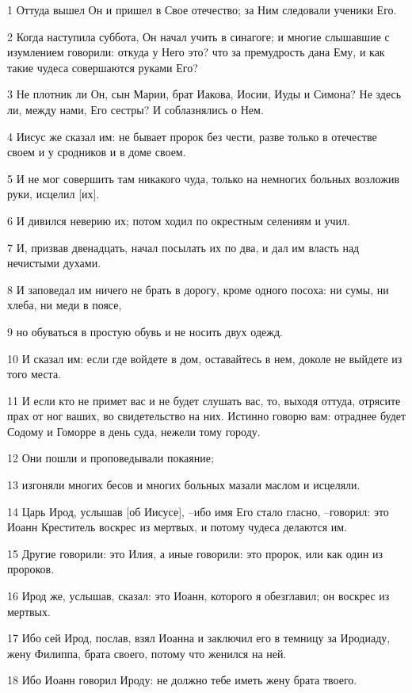 \par 1 Оттуда вышел Он и пришел в Свое отечество; за Ним следовали ученики Его.
\par 2 Когда наступила суббота, Он начал учить в синагоге; и многие слышавшие с изумлением говорили: откуда у Него это? что за премудрость дана Ему, и как такие чудеса совершаются руками Его?
\par 3 Не плотник ли Он, сын Марии, брат Иакова, Иосии, Иуды и Симона? Не здесь ли, между нами, Его сестры? И соблазнялись о Нем.
\par 4 Иисус же сказал им: не бывает пророк без чести, разве только в отечестве своем и у сродников и в доме своем.
\par 5 И не мог совершить там никакого чуда, только на немногих больных возложив руки, исцелил [их].
\par 6 И дивился неверию их; потом ходил по окрестным селениям и учил.
\par 7 И, призвав двенадцать, начал посылать их по два, и дал им власть над нечистыми духами.
\par 8 И заповедал им ничего не брать в дорогу, кроме одного посоха: ни сумы, ни хлеба, ни меди в поясе,
\par 9 но обуваться в простую обувь и не носить двух одежд.
\par 10 И сказал им: если где войдете в дом, оставайтесь в нем, доколе не выйдете из того места.
\par 11 И если кто не примет вас и не будет слушать вас, то, выходя оттуда, отрясите прах от ног ваших, во свидетельство на них. Истинно говорю вам: отраднее будет Содому и Гоморре в день суда, нежели тому городу.
\par 12 Они пошли и проповедывали покаяние;
\par 13 изгоняли многих бесов и многих больных мазали маслом и исцеляли.
\par 14 Царь Ирод, услышав [об Иисусе], --ибо имя Его стало гласно, --говорил: это Иоанн Креститель воскрес из мертвых, и потому чудеса делаются им.
\par 15 Другие говорили: это Илия, а иные говорили: это пророк, или как один из пророков.
\par 16 Ирод же, услышав, сказал: это Иоанн, которого я обезглавил; он воскрес из мертвых.
\par 17 Ибо сей Ирод, послав, взял Иоанна и заключил его в темницу за Иродиаду, жену Филиппа, брата своего, потому что женился на ней.
\par 18 Ибо Иоанн говорил Ироду: не должно тебе иметь жену брата твоего.
